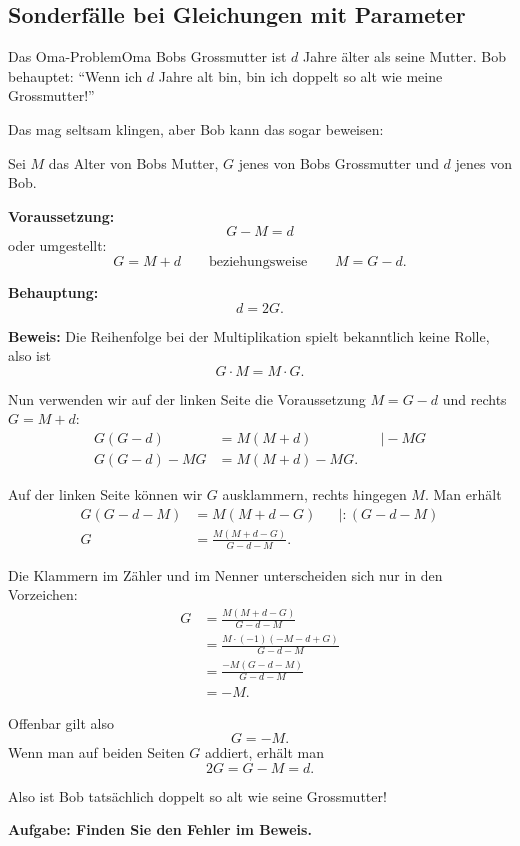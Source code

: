 \subsection{Sonderfälle bei Gleichungen mit Parameter}
\begin{LA}
    {Das Oma-Problem}{Oma}
    Bobs Grossmutter ist \(d\) Jahre älter als seine Mutter. Bob behauptet: ``Wenn ich \(d\) Jahre alt bin, bin ich doppelt so alt wie meine Grossmutter!''

    Das mag seltsam klingen, aber Bob kann das sogar beweisen:

    Sei \(M\) das Alter von Bobs Mutter, \(G\) jenes von Bobs Grossmutter und \(d\) jenes von Bob.

    \textbf{Voraussetzung:}
    \[
        G-M=d
    \]
    oder umgestellt:
    \[
        G=M+d
        \qquad\text{beziehungsweise}\qquad
        M=G-d.
    \]

    \textbf{Behauptung:}
    \[
        d=2G.
    \]

    \textbf{Beweis:}
    Die Reihenfolge bei der Multiplikation spielt bekanntlich keine Rolle, also ist
    \[
        G\cdot M=M\cdot G.
    \]

    Nun verwenden wir auf der linken Seite die Voraussetzung \(M=G-d\) und rechts \(G=M+d\):
    \[
        \begin{aligned}
            G(G-d)    & = M(M+d)     &  & \mid -MG \\
            G(G-d)-MG & = M(M+d)-MG.
        \end{aligned}
    \]

    Auf der linken Seite können wir \(G\) ausklammern, rechts hingegen \(M\). Man erhält
    \[
        \begin{aligned}
            G(G-d-M) & = M(M+d-G)
                     &                           & \mid :(G-d-M) \\
            G        & = \frac{M(M+d-G)}{G-d-M}.
        \end{aligned}
    \]

    Die Klammern im Zähler und im Nenner unterscheiden sich nur in den Vorzeichen:
    \[
        \begin{aligned}
            G
             & =\frac{M(M+d-G)}{G-d-M}           \\
             & =\frac{M\cdot(-1)(-M-d+G)}{G-d-M} \\
             & =\frac{-M(G-d-M)}{G-d-M}          \\
             & =-M.
        \end{aligned}
    \]

    Offenbar gilt also
    \[
        G=-M.
    \]
    Wenn man auf beiden Seiten \(G\) addiert, erhält man
    \[
        2G=G-M=d.
    \]

    Also ist Bob tatsächlich doppelt so alt wie seine Grossmutter!

    \bigskip

    \textbf{Aufgabe: Finden Sie den Fehler im Beweis.}
\end{LA}







